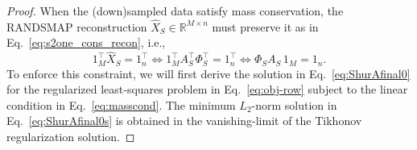 \documentclass[10pt,a4paper]{amsart}
\begin{document}
\begin{proof}
When the (down)sampled data satisfy mass conservation, the RANDSMAP reconstruction $\widehat{X}_S \in \mathbb{R}^{M \times n}$ must preserve it as in Eq.~\eqref{eq:s2one_cons_recon}, i.e., 
\begin{equation}
1_M^\top \widehat{X}_S = 1_n^\top \Leftrightarrow 1_M^\top A_S^\top \Phi_S^\top  = 1_n^\top \Leftrightarrow \Phi_S A_S\,1_M = 1_n.%
\label{eq:masscond}
\end{equation}
To enforce this constraint, we will first derive the solution in Eq.~\eqref{eq:ShurAfinal0} for the regularized least‑squares problem in Eq.~\eqref{eq:obj-row} subject to the linear condition in Eq.~\eqref{eq:masscond}. The minimum $L_2$-norm solution in Eq.~\eqref{eq:ShurAfinal0s} is obtained in the vanishing-limit of the Tikhonov regularization solution.


\end{proof}
\end{document}
